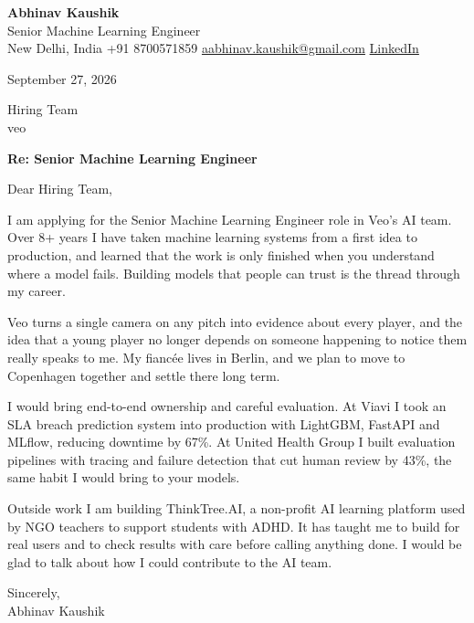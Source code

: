 \documentclass[11pt,a4paper]{article}
\begin{document}
{\Large\bfseries Abhinav Kaushik}\\
Senior Machine Learning Engineer\\
New Delhi, India \textbar{} +91 8700571859 \textbar{} \href{mailto:aabhinav.kaushik@gmail.com}{aabhinav.kaushik@gmail.com} \textbar{} \href{https://www.linkedin.com/in/abhinav-kaushik10/}{LinkedIn}  

September 27, 2026

Hiring Team\\
veo

\textbf{Re: Senior Machine Learning Engineer}

Dear Hiring Team,

I am applying for the Senior Machine Learning Engineer role in Veo's AI team. Over 8+ years I have taken machine learning systems from a first idea to production, and learned that the work is only finished when you understand where a model fails. Building models that people can trust is the thread through my career.

Veo turns a single camera on any pitch into evidence about every player, and the idea that a young player no longer depends on someone happening to notice them really speaks to me. My fiancée lives in Berlin, and we plan to move to Copenhagen together and settle there long term.

I would bring end-to-end ownership and careful evaluation. At Viavi I took an SLA breach prediction system into production with LightGBM, FastAPI and MLflow, reducing downtime by 67\%. At United Health Group I built evaluation pipelines with tracing and failure detection that cut human review by 43\%, the same habit I would bring to your models.

Outside work I am building ThinkTree.AI, a non-profit AI learning platform used by NGO teachers to support students with ADHD. It has taught me to build for real users and to check results with care before calling anything done. I would be glad to talk about how I could contribute to the AI team.

Sincerely,\\[4pt]
Abhinav Kaushik
\end{document}
